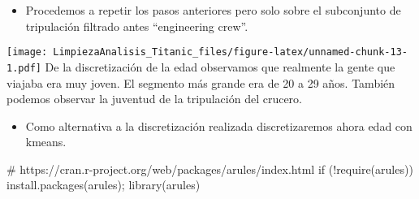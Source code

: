 \documentclass[
]{article}
\newenvironment{Shaded}{\begin{snugshade}}{\end{snugshade}}
\newcommand{\AttributeTok}[1]{\textcolor[rgb]{0.80,0.80,0.80}{#1}}
\newcommand{\CommentTok}[1]{\textcolor[rgb]{0.50,0.62,0.50}{#1}}
\newcommand{\ControlFlowTok}[1]{\textcolor[rgb]{0.94,0.87,0.69}{#1}}
\newcommand{\DecValTok}[1]{\textcolor[rgb]{0.86,0.86,0.80}{#1}}
\newcommand{\FunctionTok}[1]{\textcolor[rgb]{0.94,0.94,0.56}{#1}}
\newcommand{\NormalTok}[1]{\textcolor[rgb]{0.80,0.80,0.80}{#1}}
\newcommand{\OtherTok}[1]{\textcolor[rgb]{0.94,0.94,0.56}{#1}}
\newcommand{\SpecialCharTok}[1]{\textcolor[rgb]{0.86,0.64,0.64}{#1}}
\newcommand{\StringTok}[1]{\textcolor[rgb]{0.80,0.58,0.58}{#1}}
\providecommand{\tightlist}{%
  \setlength{\itemsep}{0pt}\setlength{\parskip}{0pt}}
\begin{document}
\begin{itemize}
\tightlist
\item
  Procedemos a repetir los pasos anteriores pero solo sobre el
  subconjunto de tripulación filtrado antes ``engineering crew''.
\end{itemize}

\begin{Shaded}
\end{Shaded}

\texttt{[image: LimpiezaAnalisis\_Titanic\_files/figure-latex/unnamed-chunk-13-1.pdf]}
De la discretización de la edad observamos que realmente la gente que
viajaba era muy joven. El segmento más grande era de 20 a 29 años.
También podemos observar la juventud de la tripulación del crucero.

\begin{itemize}
\tightlist
\item
  Como alternativa a la discretización realizada discretizaremos ahora
  edad con kmeans.
\end{itemize}

\begin{Shaded}
\begin{Highlighting}[]
\CommentTok{\# https://cran.r{-}project.org/web/packages/arules/index.html}
\ControlFlowTok{if}\NormalTok{ (}\SpecialCharTok{!}\FunctionTok{require}\NormalTok{(}\StringTok{\textquotesingle{}arules\textquotesingle{}}\NormalTok{)) }\FunctionTok{install.packages}\NormalTok{(}\StringTok{\textquotesingle{}arules\textquotesingle{}}\NormalTok{); }\FunctionTok{library}\NormalTok{(}\StringTok{\textquotesingle{}arules\textquotesingle{}}\NormalTok{)}
\end{Highlighting}
\end{Shaded}
\end{document}
